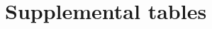 \documentclass[a4paper,11pt,abstracton,hidelinks]{scrartcl}
\begin{document}
%
%
%
%
%
%
%
%
%
%
%
%
%
%


\clearpage

\section{Supplemental tables}
\end{document}
